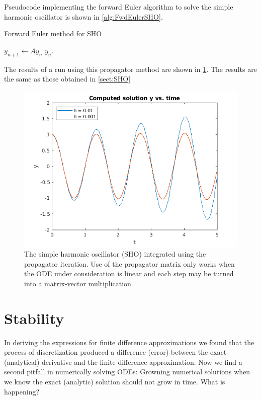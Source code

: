 \documentclass[hidelinks,notitlepage]{book}
\begin{document}
Pseudocode implementing the forward Euler algorithm to solve the simple harmonic oscillator is shown in \cref{alg:FwdEulerSHO}.
\begin{algorithm}
	\caption{Forward Euler method for SHO}
	\label{alg:FwdEulerSHO}
	\begin{algorithmic} 
		\STATE ${y_{n+1}} \leftarrow {A} {y_n}$
		\ENDFOR
		\RETURN ${y_n}$.
	\end{algorithmic}
\end{algorithm}
The results of a run using this propagator method are shown in \cref{fig:ForwardEulerSHOPropagator}.  The results are the same as those obtained in \cref{sect:SHO}
\begin{figure}[tbh]
	\centering
	\includegraphics[width=0.7\columnwidth]{ForwardEulerSHOPropagator.png}
	\caption{The simple harmonic oscillator (SHO) integrated using the propagator iteration.  Use of the propagator matrix only works when the ODE under consideration is linear and each step may be turned into a matrix-vector multiplication.}
	\label{fig:ForwardEulerSHOPropagator}
\end{figure}

\section{Stability}
\label{sect:stability}
In deriving the expressions for finite difference approximations we found that the process of discretization produced a difference (error) between the exact (analytical) derivative and the finite difference approximation.  Now we find a second pitfall in numerically solving ODEs:  Growning numerical solutions when we know the exact (analytic) solution should not grow in time.  What is happening?
\end{document}
